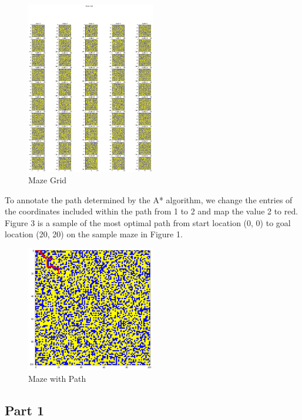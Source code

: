 \documentclass{article}
\begin{document}
\begin{figure}[!htbp]
\centering
\includegraphics[width=0.5\textwidth, height=0.5\textheight,keepaspectratio]{maze_grid.png}
\caption{Maze Grid}
    \label{fig:Map}
\end{figure}

\noindent
To annotate the path determined by the A* algorithm, we change the entries of the coordinates included within the path from 1 to 2 and map the value 2 to red. Figure 3 is a sample of the most optimal path from start location (0, 0) to goal location (20, 20) on the sample maze in Figure 1.

\begin{figure}[!htbp]
\centering
\includegraphics[width=0.5\textwidth, height=0.5\textheight,keepaspectratio]{maze_with_path.png}
\caption{Maze with Path}
    \label{fig:Map}
\end{figure}

\subsection*{Part 1}
\end{document}
